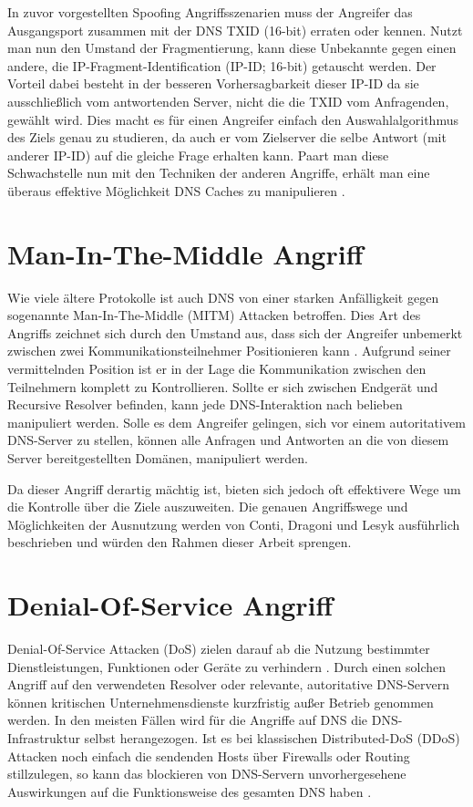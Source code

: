 In zuvor vorgestellten Spoofing Angriffsszenarien muss der Angreifer das Ausgangsport zusammen mit der DNS TXID (16-bit) erraten oder kennen. Nutzt man nun den Umstand der Fragmentierung, kann diese Unbekannte gegen einen andere, die IP-Fragment-Identification (IP-ID; 16-bit) getauscht werden. Der Vorteil dabei besteht in der besseren Vorhersagbarkeit dieser IP-ID da sie ausschließlich vom antwortenden Server, nicht die die TXID vom Anfragenden, gewählt wird. Dies macht es für einen Angreifer einfach den Auswahlalgorithmus des Ziels genau zu studieren, da auch er vom Zielserver die selbe Antwort (mit anderer IP-ID) auf die gleiche Frage erhalten kann. Paart man diese Schwachstelle nun mit den Techniken der anderen Angriffe, erhält man eine überaus effektive Möglichkeit DNS Caches zu manipulieren \cite{Herzberg2013}.

\section{Man-In-The-Middle Angriff}
Wie viele ältere Protokolle ist auch DNS von einer starken Anfälligkeit gegen sogenannte Man-In-The-Middle (MITM) Attacken betroffen. Dies Art des Angriffs zeichnet sich durch den Umstand aus, dass sich der Angreifer unbemerkt zwischen zwei Kommunikationsteilnehmer Positionieren kann \cite{CAPEC94}. Aufgrund seiner vermittelnden Position ist er in der Lage die Kommunikation zwischen den Teilnehmern komplett zu Kontrollieren. Sollte er sich zwischen Endgerät und Recursive Resolver befinden, kann jede DNS-Interaktion nach belieben manipuliert werden. Solle es dem Angreifer gelingen, sich vor einem autoritativem DNS-Server zu stellen, können alle Anfragen und Antworten an die von diesem Server bereitgestellten Domänen, manipuliert werden. 

Da dieser Angriff derartig mächtig ist, bieten sich jedoch oft effektivere Wege um die Kontrolle über die Ziele auszuweiten. Die genauen Angriffswege und Möglichkeiten der Ausnutzung werden von Conti, Dragoni und Lesyk \cite{Conti2016} ausführlich beschrieben und würden den Rahmen dieser Arbeit sprengen.

\section{Denial-Of-Service Angriff}
\label{sec:attacks-dos}
Denial-Of-Service Attacken (DoS) zielen darauf ab die Nutzung bestimmter Dienstleistungen, Funktionen oder Geräte zu verhindern \cite{BSIG040}. Durch einen solchen Angriff auf den verwendeten Resolver oder relevante, autoritative DNS-Servern können kritischen Unternehmensdienste kurzfristig außer Betrieb genommen werden. In den meisten Fällen wird für die Angriffe auf DNS die DNS-Infrastruktur selbst herangezogen. Ist es bei klassischen Distributed-DoS (DDoS) Attacken noch einfach die sendenden Hosts über Firewalls oder Routing stillzulegen, so kann das blockieren von DNS-Servern unvorhergesehene Auswirkungen auf die Funktionsweise des gesamten DNS haben \cite{Kambourakis2008}. 


